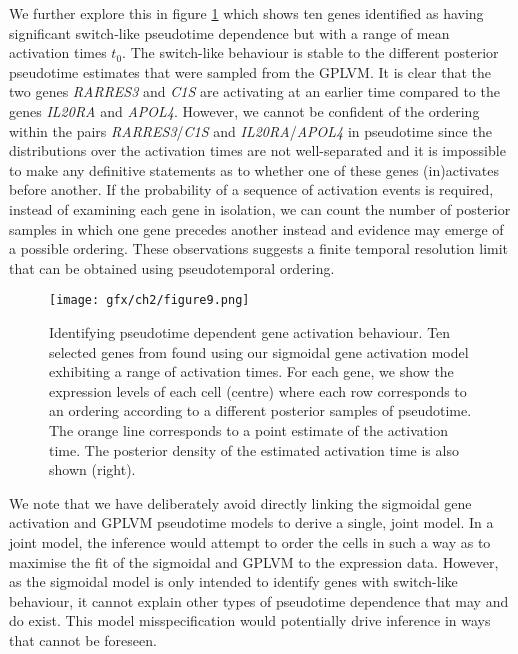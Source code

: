 We further explore this in figure \ref{fig:switchres2} which shows ten genes identified as having significant switch-like pseudotime dependence but with a range of mean activation times $t_0$. The switch-like behaviour is stable to the different posterior pseudotime estimates that were sampled from the GPLVM. It is clear that the two genes \emph{RARRES3} and \emph{C1S} are activating at an earlier time compared to the genes \emph{IL20RA} and \emph{APOL4}. However, we cannot be confident of the ordering within the pairs \emph{RARRES3}/\emph{C1S} and \emph{IL20RA}/\emph{APOL4} in pseudotime since the distributions over the activation times are not well-separated and it is impossible to make any definitive statements as to whether one of these genes (in)activates before another. If the probability of a sequence of activation events is required, instead of examining each gene in isolation, we can count the number of posterior samples in which one gene precedes another instead and evidence may emerge of a possible ordering. These observations suggests a finite temporal resolution limit that can be obtained using pseudotemporal ordering.

\begin{figure}%
\centering
	\texttt{[image: gfx/ch2/figure9.png]}
\caption[Identifying pseudotime dependent gene activation behaviour.]{ Identifying pseudotime dependent gene activation behaviour. Ten selected genes from \cite{Trapnell2014-xi} found using our  sigmoidal gene activation model exhibiting a range of activation times. For each gene, we show the expression levels of each cell (centre) where each row corresponds to an ordering according to a different posterior samples of pseudotime. The orange line corresponds to a point estimate of the activation time. The posterior density of the estimated activation time is also shown (right).
} \label{fig:switchres2}
\end{figure}

We note that we have deliberately avoid directly linking the sigmoidal gene activation and GPLVM pseudotime models to derive a single, joint model. In a joint model, the inference would attempt to order the cells in such a way as to maximise the fit of the sigmoidal and GPLVM to the expression data. However, as the sigmoidal model is only intended to identify genes with switch-like behaviour, it cannot explain other types of pseudotime dependence that may and do exist. This model misspecification would potentially drive inference in ways that cannot be foreseen.

